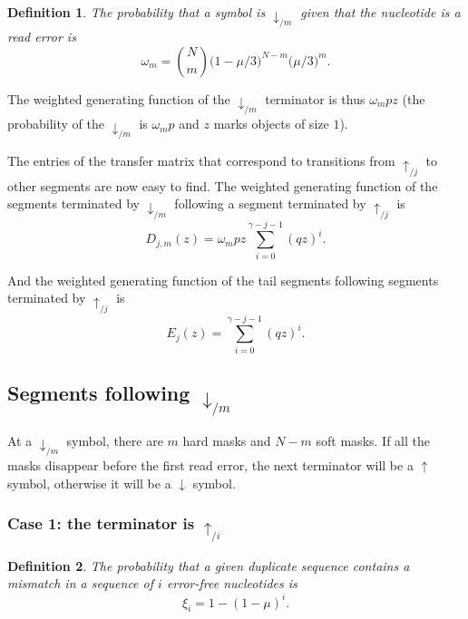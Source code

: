 \documentclass{article}
\newtheorem{definition}{Definition}
\begin{document}
\begin{definition}
The probability that a symbol is $\downarrow_{/m}$ given that the
nucleotide is a read error is
\begin{equation}
\label{eq:omega}
\omega_m = {N \choose m} \big(1 - \mu/3\big)^{N-m} \big(\mu/3\big)^m.
\end{equation}
\end{definition}

The weighted generating function of the $\downarrow_{/m}$ terminator is
thus $\omega_m pz$ (the probability of the $\downarrow_{/m}$ is $\omega_m
p$ and $z$ marks objects of size $1$).

The entries of the transfer matrix that correspond to transitions from
$\uparrow_{/j}$ to other segments are now easy to find. The weighted
generating function of the segments terminated by $\downarrow_{/m}$
following a segment terminated by $\uparrow_{/j}$ is
\begin{equation}
\label{eq:D}
D_{j,m}(z) = \omega_m pz \sum_{i=0}^{\gamma-j-1} (qz)^i.
\end{equation}

And the weighted generating function of the tail segments following
segments terminated by $\uparrow_{/j}$ is
\begin{equation}
\label{eq:E}
E_j(z) = \sum_{i=0}^{\gamma-j-1} (qz)^i.
\end{equation}


\subsection{Segments following $\downarrow_{/m}$}

At a $\downarrow_{/m}$ symbol, there are $m$ hard masks and $N-m$ soft
masks. If all the masks disappear before the first read error, the next
terminator will be a $\uparrow$ symbol, otherwise it will be a
$\downarrow$ symbol.

\subsubsection*{Case 1: the terminator is $\uparrow_{/i}$}

\begin{definition}
The probability that a given duplicate sequence contains a mismatch in a
sequence of $i$ error-free nucleotides is
\begin{equation}
\label{eq:xi}
\xi_i = 1-(1-\mu)^i.
\end{equation}
\end{definition}
\end{document}
